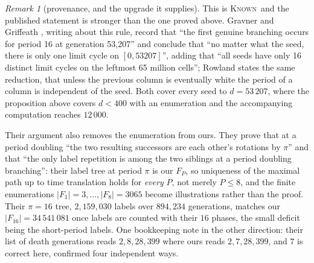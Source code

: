 \documentclass[11pt]{article}
\theoremstyle{definition}
\theoremstyle{remark}
\newtheorem{remark}[theorem]{Remark}
\newcommand{\KNOWN}{\textsc{Known}}
\begin{document}
\begin{remark}[provenance, and the upgrade it supplies]\label{fr:universalwall:prov}
This is \KNOWN\ and the published statement is stronger than the one proved above. Gravner and Griffeath
\cite[\S8]{GG}, writing about this rule, record that ``the first genuine branching occurs for period 16 at
generation 53{,}207'' and conclude that ``no matter what the seed, there is only one limit cycle on
$[0,53207]$'', adding that ``all seeds have only 16 distinct limit cycles on the leftmost 65 million
cells''; Rowland \cite[\S5]{Rowland} states the same reduction, that unless the previous column is
eventually white the period of a column is independent of the seed. Both cover every seed to $d=53\,207$,
where the proposition above covers $d<400$ with an enumeration and the accompanying computation reaches
$12\,000$.

Their argument also removes the enumeration from ours. They prove that at a period doubling ``the two
resulting successors are each other's rotations by $\pi$'' and that ``the only label repetition is among
the two siblings at a period doubling branching'': their label tree at period $\pi$ is our $F_P$, so
uniqueness of the maximal path up to time translation holds for \emph{every} $P$, not merely $P\le8$, and
the finite enumerations $|F_1|=3,\dots,|F_8|=3065$ become illustrations rather than the proof. Their
$\pi=16$ tree, $2{,}159{,}030$ labels over $894{,}234$ generations, matches our $|F_{16}|=34\,541\,081$
once labels are counted with their $16$ phases, the small deficit being the short-period labels. One
bookkeeping note in the other direction: their list of death generations reads $2,8,28,399$ where ours
reads $2,7,28,399$, and $7$ is correct here, confirmed four independent ways.
\end{remark}
\end{document}
